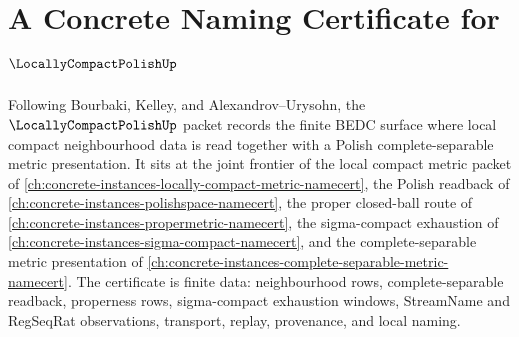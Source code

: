 \chapter{A Concrete Naming Certificate for $\LocallyCompactPolishUp$}
\label{ch:concrete-instances-locally-compact-polish-namecert}

Following Bourbaki, Kelley, and Alexandrov--Urysohn, the $\LocallyCompactPolishUp$ packet records the finite BEDC surface where local compact neighbourhood data is read together with a Polish complete-separable metric presentation. It sits at the joint frontier of the local compact metric packet of \autoref{ch:concrete-instances-locally-compact-metric-namecert}, the Polish readback of \autoref{ch:concrete-instances-polishspace-namecert}, the proper closed-ball route of \autoref{ch:concrete-instances-propermetric-namecert}, the sigma-compact exhaustion of \autoref{ch:concrete-instances-sigma-compact-namecert}, and the complete-separable metric presentation of \autoref{ch:concrete-instances-complete-separable-metric-namecert}. The certificate is finite data: neighbourhood rows, complete-separable readback, properness rows, sigma-compact exhaustion windows, StreamName and RegSeqRat observations, transport, replay, provenance, and local naming.

